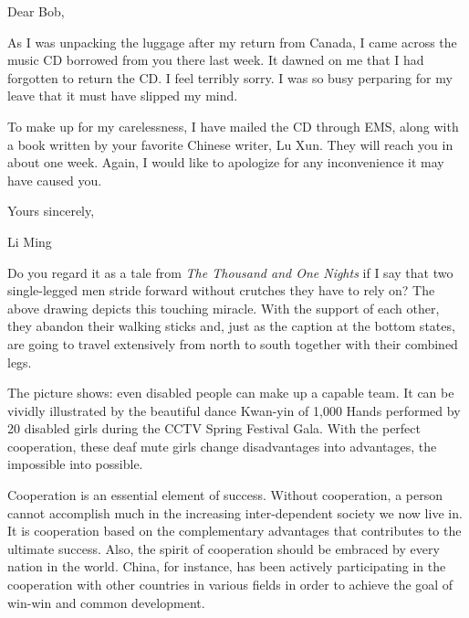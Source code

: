 Dear Bob,

As I was unpacking the luggage after my return from Canada, I came across the music CD borrowed from you there last week. It dawned on me that I had forgotten to return the CD. I feel terribly sorry. I was so busy perparing for my leave that it must have slipped my mind.

To make up for my carelessness, I have mailed the CD through EMS, along with a book written by your favorite Chinese writer, Lu Xun. They will reach you in about one week. Again, I would like to apologize for any inconvenience it may have caused you.

\begin{flushright}Yours sincerely,

Li Ming\end{flushright}

Do you regard it as a tale from \emph{The Thousand and One Nights} if I say that two single-legged men stride forward without crutches they have to rely on? The above drawing depicts this touching miracle. With the support of each other, they abandon their walking sticks and, just as the caption at the bottom states, are going to travel extensively from north to south together with their combined legs.

The picture shows: even disabled people can make up a capable team. It can be vividly illustrated by the beautiful dance Kwan-yin of 1,000 Hands performed by 20 disabled girls during the CCTV Spring Festival Gala. With the perfect cooperation, these deaf mute girls change disadvantages into advantages, the impossible into possible.

Cooperation is an essential element of success. Without cooperation, a person cannot accomplish much in the increasing inter-dependent society we now live in. It is cooperation based on the complementary advantages that contributes to the ultimate success. Also, the spirit of cooperation should be embraced by every nation in the world. China, for instance, has been actively participating in the cooperation with other countries in various fields in order to achieve the goal of win-win and common development.